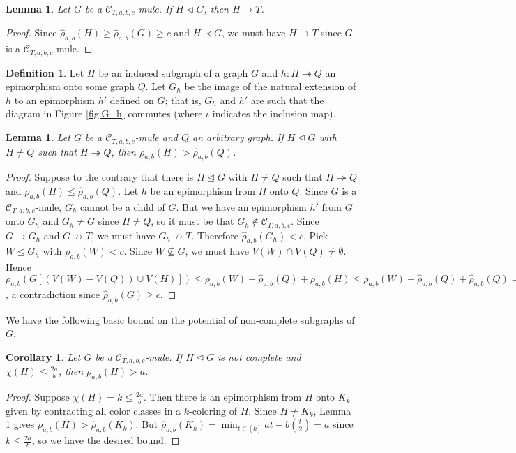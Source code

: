 \documentclass[12pt]{amsart}
\theoremstyle{plain}
\newtheorem{lem}[thm]{Lemma}
\newtheorem{cor}[thm]{Corollary}
\theoremstyle{definition}
\newtheorem{defn}{Definition}
\theoremstyle{remark}
\newcommand{\fancy}[1]{\mathcal{#1}}
\newcommand{\C}{\fancy{C}}
\newcommand{\surj}{\twoheadrightarrow}
\newcommand{\funcsurj}[3]{#1\colon #2 \surj #3}
\newcommand{\irange}[1]{\left[#1\right]}
\newcommand{\parens}[1]{\left( #1 \right)}
\newcommand{\brackets}[1]{\left[ #1 \right]}
\begin{document}
\begin{lem}
Let $G$ be a $\C_{T,a,b,c}$-mule.  If $H \lhd G$, then $H \rightarrow T$.
\end{lem}
\begin{proof}
Since $\hat{\rho}_{a,b}(H) \ge \hat{\rho}_{a,b}(G) \ge c$ and $H \prec G$, we must have $H \rightarrow T$ since $G$ is a $\C_{T,a,b,c}$-mule.
\end{proof}

\begin{defn}\label{InducedHomomorphism}
Let $H$ be an induced subgraph of a graph $G$ and $\funcsurj{h}{H}{Q}$ an epimorphism onto some graph $Q$. Let $G_h$ be the image of the natural extension of $h$ to an epimorphism $h'$ defined on $G$; that is, $G_h$ and $h'$ are such that the diagram in Figure \ref{fig:G_h} commutes (where $\iota$ indicates the inclusion map).
\end{defn}

\begin{lem}\label{ArbitraryQ}
Let $G$ be a $\C_{T,a,b,c}$-mule and $Q$ an arbitrary graph.  If $H \unlhd G$ with $H \ne Q$ such that $H \surj Q$, then $\rho_{a,b}(H) > \hat{\rho}_{a,b}(Q)$.
\end{lem}
\begin{proof}
Suppose to the contrary that there is $H \unlhd G$ with $H \ne Q$ such that $H \surj Q$ and $\rho_{a,b}(H) \le \hat{\rho}_{a,b}(Q)$.  
Let $h$ be an epimorphism from $H$ onto $Q$. Since $G$ is a $\C_{T,a,b,c}$-mule, $G_h$ cannot be a child of $G$.  But we have an epimorphism $h'$ from $G$ onto $G_h$ and $G_h \ne G$ since $H \ne Q$, so it must be that $G_h \not \in \C_{T,a,b,c}$.  Since $G \rightarrow G_h$ and $G \not \rightarrow T$, we must have $G_h \not \rightarrow T$.  Therefore $\hat{\rho}_{a,b}(G_h) < c$.  Pick $W \unlhd G_h$ with $\rho_{a,b}(W) < c$.  Since $W \not \subseteq G$, we must have $V(W) \cap V(Q) \ne \emptyset$.  Hence $\rho_{a,b}\parens{G\brackets{(V(W) - V(Q)) \cup V(H)}} \le \rho_{a,b}(W) - \hat{\rho}_{a,b}(Q) + \rho_{a,b}(H) \le  \rho_{a,b}(W) - \hat{\rho}_{a,b}(Q) + \hat{\rho}_{a,b}(Q) = \rho_{a,b}(W) < c$, a contradiction since $\hat{\rho}_{a,b}(G) \ge c$.
\end{proof}

We have the following basic bound on the potential of non-complete subgraphs of $G$.
\begin{cor}\label{CompleteQ}
Let $G$ be a $\C_{T,a,b,c}$-mule. If $H \unlhd G$ is not complete and $\chi(H) \le \frac{2a}{b}$, then $\rho_{a,b}(H) > a$.
\end{cor}
\begin{proof}
Suppose $\chi(H) = k \le \frac{2a}{b}$.  Then there is an epimorphism from $H$ onto $K_k$ given by contracting all color classes in a $k$-coloring of $H$.  Since $H \ne K_k$, Lemma \ref{ArbitraryQ} gives
$\rho_{a,b}(H) > \hat{\rho}_{a,b}(K_k)$.  But $\hat{\rho}_{a,b}(K_k) = \min_{t \in \irange{k}} at - b\binom{t}{2} = a$ since $k \le \frac{2a}{b}$, so we have the desired bound.
\end{proof}



\end{document}
